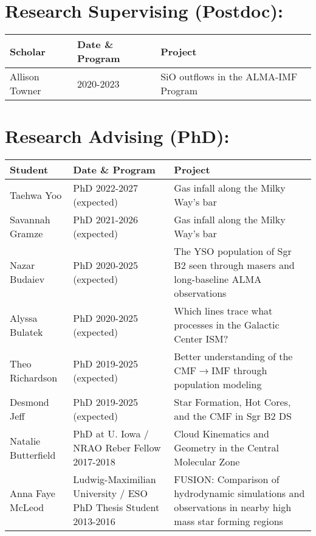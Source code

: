\begin{minipage}{\textwidth}
\setlength{\extrarowheight}{4pt}
\section*{Research Supervising (Postdoc): }
\vspace{-12pt}
\begin{tabular}{lp{2.1in}p{2.6in}}
    Scholar & Date  \& Program &   Project \\
    \hline
    Allison Towner          &  2020-2023  &                                     SiO outflows in the ALMA-IMF Program \\
\end{tabular}
\end{minipage}


\begin{minipage}{\textwidth}
\setlength{\extrarowheight}{4pt}
\section*{Research Advising (PhD): }
\vspace{-12pt}
\begin{tabular}{lp{2.1in}p{2.6in}}
    Student & Date  \& Program &   Project \\
    \hline
    Taehwa Yoo          &  PhD 2022-2027 (expected) &                                     Gas infall along the Milky Way's bar \\
    Savannah Gramze     &  PhD 2021-2026 (expected) &                                     Gas infall along the Milky Way's bar \\
    Nazar Budaiev       &  PhD 2020-2025 (expected) &                                    The YSO population of Sgr B2 seen through masers and long-baseline ALMA observations  \\
    Alyssa Bulatek      &  PhD 2020-2025 (expected) &                                    Which lines trace what processes in the Galactic Center ISM?  \\
    Theo Richardson     &  PhD 2019-2025 (expected)  &                                   Better understanding of the CMF$\rightarrow$IMF through population modeling  \\
    Desmond Jeff        &  PhD 2019-2025 (expected)  &                                    Star Formation, Hot Cores, and the CMF in Sgr B2 DS \\
    Natalie Butterfield &  PhD at U. Iowa / NRAO Reber Fellow 2017-2018   &                     Cloud Kinematics and Geometry in the Central Molecular Zone \\
    Anna Faye McLeod    &  Ludwig-Maximilian University / ESO PhD Thesis Student 2013-2016  &  FUSION: Comparison of hydrodynamic simulations and observations in nearby high mass star forming regions  \\
\end{tabular}
\end{minipage}


